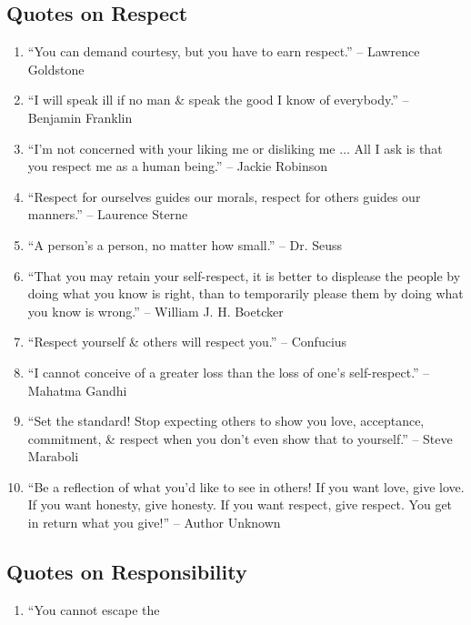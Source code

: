 \documentclass{article}
\begin{document}
\subsection{Quotes on Respect}

\begin{enumerate}
	\item ``You can demand courtesy, but you have to earn respect.'' -- Lawrence Goldstone
	\item ``I will speak ill if no man \& speak the good I know of everybody.'' -- Benjamin Franklin
	\item ``I'm not concerned with your liking me or disliking me $\ldots$ All I ask is that you respect me as a human being.'' -- Jackie Robinson
	\item ``Respect for ourselves guides our morals, respect for others guides our manners.'' -- Laurence Sterne
	\item ``A person's a person, no matter how small.'' -- Dr. Seuss
	\item ``That you may retain your self-respect, it is better to displease the people by doing what you know is right, than to temporarily please them by doing what you know is wrong.'' -- William J. H. Boetcker
	\item ``Respect yourself \& others will respect you.'' -- Confucius
	\item ``I cannot conceive of a greater loss than the loss of one's self-respect.'' -- Mahatma Gandhi
	\item ``Set the standard! Stop expecting others to show you love, acceptance, commitment, \& respect when you don't even show that to yourself.'' -- Steve Maraboli
	\item ``Be a reflection of what you'd like to see in others! If you want love, give love. If you want honesty, give honesty. If you want respect, give respect. You get in return what you give!'' -- Author Unknown
\end{enumerate}

\subsection{Quotes on Responsibility}

\begin{enumerate}
	\item ``You cannot escape the 
\end{enumerate}

\end{document}
